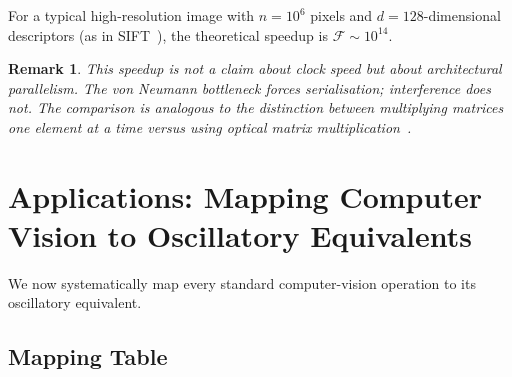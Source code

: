 \documentclass[11pt,twocolumn,a4paper]{article}
\newtheorem{remark}[theorem]{Remark}
\begin{document}
For a typical high-resolution image with $n = 10^6$ pixels and $d = 128$-dimensional descriptors (as in SIFT~\citep{lowe2004}), the theoretical speedup is $\mathcal{F} \sim 10^{14}$.

\begin{remark}
This speedup is not a claim about clock speed but about \emph{architectural parallelism}. The von Neumann bottleneck forces serialisation; interference does not. The comparison is analogous to the distinction between multiplying matrices one element at a time versus using optical matrix multiplication~\citep{hopfield1982}.
\end{remark}

\section{Applications: Mapping Computer Vision to Oscillatory Equivalents}\label{sec:applications}

We now systematically map every standard computer-vision operation to its oscillatory equivalent.

\subsection{Mapping Table}
\end{document}
